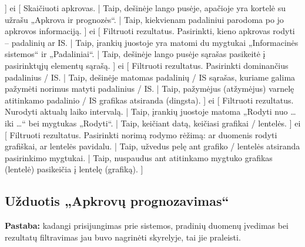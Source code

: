 {    ]
  ei [
    Skaičiuoti apkrovas. |
    Taip, dešinėje lango pusėje, apačioje yra kortelė su užrašu
    „Apkrova ir prognozės“. |
    Taip, kiekvienam padaliniui parodoma po jo apkrovos informaciją.
    ]
  ei [
    Filtruoti rezultatus. Pasirinkti, kieno apkrovas rodyti –
    padalinių ar IS. |
    Taip, įrankių juostoje yra matomi du mygtukai „Informacinės sistemos“
    ir „Padaliniai“. |
    Taip, dešinėje lango pusėje sąrašas pasikeitė į pasirinktųjų elementų
    sąrašą.
    ]
  ei [
    Filtruoti rezultatus. Pasirinkti dominančius padalinius / IS. |
    Taip, dešinėje matomas padalinių / IS sąrašas, kuriame galima pažymėti
    norimus matyti padalinius / IS. |
    Taip, pažymėjus (atžymėjus) varnelę atitinkamo padalinio / IS 
    grafikas atsiranda (dingsta).
    ]
  ei [
    Filtruoti rezultatus. Nurodyti aktualų laiko intervalą. |
    Taip, įrankių juostoje matoma „Rodyti nuo … iki …“ bei mygtukas
    „Rodyti“. |
    Taip, keičiant datą, keičiasi grafikai / lentelės.
    ]
  ei [
    Filtruoti rezultatus. Pasirinkti norimą rodymo rėžimą: ar
    duomenis rodyti grafiškai, ar lentelės pavidalu. |
    Taip, užvedus pelę ant grafiko / lentelės atsiranda pasirinkimo
    mygtukai. |
    Taip, nuspaudus ant atitinkamo mygtuko grafikas (lentelė) pasikeičia
    į lentelę (grafiką).
    ]
}

\subsection{Užduotis „Apkrovų prognozavimas“}

\label{sec:cw_apkrovu_prognozavimas}

\textbf{Pastaba:} kadangi prisijungimas prie sistemos, pradinių
duomenų įvedimas bei rezultatų filtravimas jau buvo nagrinėti
 skyrelyje, tai jie praleisti.

